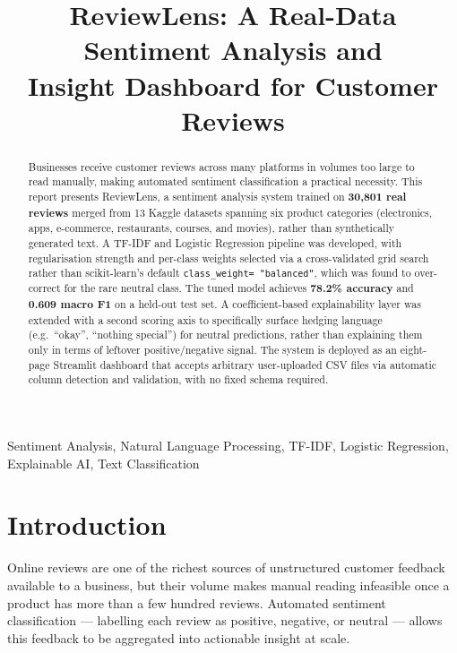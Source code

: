 \documentclass{article}
\title{ReviewLens: A Real-Data Sentiment Analysis and\\ Insight Dashboard for Customer Reviews}
\begin{document}
\ninept
\maketitle

\begin{abstract}
Businesses receive customer reviews across many platforms in volumes too
large to read manually, making automated sentiment classification a
practical necessity. This report presents ReviewLens, a sentiment analysis
system trained on \textbf{30{,}801 real reviews} merged from 13 Kaggle
datasets spanning six product categories (electronics, apps, e-commerce,
restaurants, courses, and movies), rather than synthetically generated
text. A TF-IDF and Logistic Regression pipeline was developed, with
regularisation strength and per-class weights selected via a cross-validated
grid search rather than scikit-learn's default \texttt{class\_weight=
"balanced"}, which was found to over-correct for the rare neutral class.
The tuned model achieves \textbf{78.2\% accuracy} and \textbf{0.609 macro
F1} on a held-out test set. A coefficient-based explainability layer was
extended with a second scoring axis to specifically surface hedging
language (e.g.\ ``okay'', ``nothing special'') for neutral predictions,
rather than explaining them only in terms of leftover positive/negative
signal. The system is deployed as an eight-page Streamlit dashboard that
accepts arbitrary user-uploaded CSV files via automatic column detection
and validation, with no fixed schema required.
\end{abstract}

\begin{keywords}
Sentiment Analysis, Natural Language Processing, TF-IDF, Logistic
Regression, Explainable AI, Text Classification
\end{keywords}

\section{Introduction}

Online reviews are one of the richest sources of unstructured customer
feedback available to a business, but their volume makes manual reading
infeasible once a product has more than a few hundred reviews. Automated
sentiment classification — labelling each review as positive, negative, or
neutral — allows this feedback to be aggregated into actionable insight at
scale.
\end{document}
